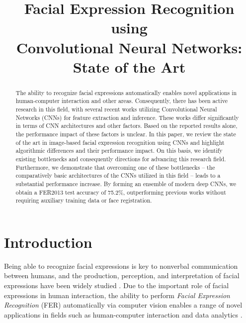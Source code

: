 \documentclass[conference,10pt,a4paper]{IEEEtran}
\begin{document}
\title{Facial Expression Recognition using\\Convolutional Neural Networks: State of the Art}

\author{
}

\maketitle

\begin{abstract}
The ability to recognize facial expressions automatically enables novel applications in human-computer interaction and other areas. Consequently, there has been active research in this field, with several recent works utilizing Convolutional Neural Networks (CNNs) for feature extraction and inference. These works differ significantly in terms of CNN architectures and other factors. Based on the reported results alone, the performance impact of these factors is unclear. In this paper, we review the state of the art in image-based facial expression recognition using CNNs and highlight algorithmic differences and their performance impact. On this basis, we identify existing bottlenecks and consequently directions for advancing this research field. Furthermore, we demonstrate that overcoming one of these bottlenecks -- the comparatively basic architectures of the CNNs utilized in this field -- leads to a substantial performance increase. By forming an ensemble of modern deep CNNs, we obtain a FER2013 test accuracy of 75.2\%, outperforming previous works without requiring auxiliary training data or face registration.

\end{abstract}

\IEEEpeerreviewmaketitle



\section{Introduction}
\label{sec:introduction}



Being able to recognize facial expressions is key to nonverbal communication between humans, and the production, perception, and interpretation of facial expressions have been widely studied \cite{sariyanidi15}. Due to the important role of facial expressions in human interaction, the ability to perform \emph{Facial Expression Recognition} (FER) automatically via computer vision enables a range of novel applications in fields such as human-computer interaction and data analytics \cite{martinez16}.
\end{document}
